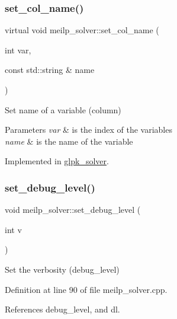 \subsubsection{\texorpdfstring{set\+\_\+col\+\_\+name()}{set\_col\_name()}}
{\footnotesize\ttfamily virtual void meilp\+\_\+solver\+::set\+\_\+col\+\_\+name (\begin{DoxyParamCaption}\item[{int}]{var,  }\item[{const std\+::string \&}]{name }\end{DoxyParamCaption})\hspace{0.3cm}{\ttfamily [pure virtual]}}



Set name of a variable (column) 


\begin{DoxyParams}{Parameters}
{\em var} & is the index of the variables \\
\hline
{\em name} & is the name of the variable \\
\hline
\end{DoxyParams}


Implemented in \hyperlink{classglpk__solver_aaed1f108a4909b6697fe7a5483bb259a}{glpk\+\_\+solver}.

\mbox{\label{classmeilp__solver_a13730dbd89312c75d175d5e7f66bb358}} 
\subsubsection{\texorpdfstring{set\+\_\+debug\+\_\+level()}{set\_debug\_level()}}
{\footnotesize\ttfamily void meilp\+\_\+solver\+::set\+\_\+debug\+\_\+level (\begin{DoxyParamCaption}\item[{int}]{v }\end{DoxyParamCaption})}



Set the verbosity (debug\+\_\+level) 



Definition at line 90 of file meilp\+\_\+solver.\+cpp.



References debug\+\_\+level, and dl.



